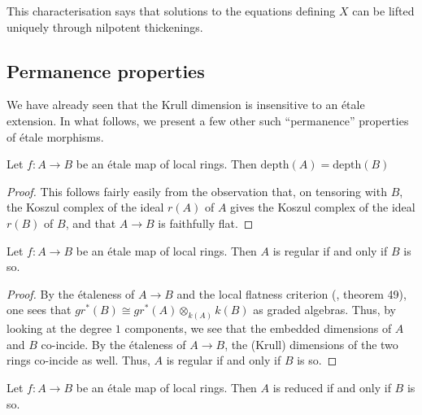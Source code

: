 \noindent
This characterisation says that solutions to the equations defining $X$ can
be lifted uniquely through nilpotent thickenings. 

\subsection{Permanence properties}
\label{subsection-properties-permanence}

\noindent
We have already seen that the Krull dimension is insensitive to an \'etale
extension. In what follows, we present a few other such ``permanence''
properties of \'etale morphisms.

\begin{proposition}
\label{proposition-etale-dimension}
Let $f:A \to B$ be an \'etale map of local rings. Then
$\mathrm{depth}(A) = \mathrm{depth}(B)$
\end{proposition}

\begin{proof}
This follows fairly easily from the observation that, on tensoring with
$B$, the Koszul complex of the ideal $r(A)$ of $A$ gives the Koszul complex
of the ideal $r(B)$ of $B$, and that $A \to B$ is faithfully flat.
\end{proof}

\begin{proposition}
\label{proposition-etale-regular}
Let $f:A \to B$ be an \'etale map of local rings. Then $A$ is regular if and
only if $B$ is so.
\end{proposition}

\begin{proof}
By the \'etaleness of $A \to B$ and the local flatness criterion
(\cite{MatCA}, theorem 49), one sees that
$gr^*(B) \cong gr^*(A) \otimes_{k(A)} k(B)$ as graded algebras. Thus,
by looking at the degree $1$ components, we see that the embedded
dimensions of $A$ and $B$ co-incide. By the \'etaleness of $A \to B$,
the (Krull) dimensions of the two rings co-incide as well. Thus, $A$ is
regular if and only if $B$ is so.
\end{proof}

\begin{proposition}
\label{proposition-etale-reduced}
Let $f:A \to B$ be an \'etale map of local rings. Then $A$ is reduced if and
only if $B$ is so.
\end{proposition}

